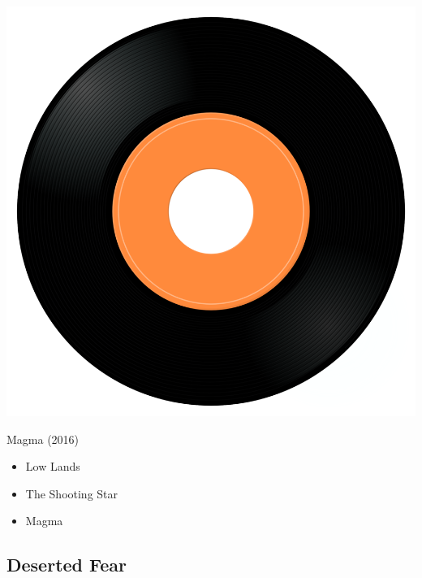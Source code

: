 \begin{minipage}[t]{0.25\textwidth}\vspace{0pt}
\captionsetup{type=figure}
\includegraphics[width=\textwidth]{Images/cover.png}
\caption*{Magma (2016)}
\end{minipage}
\begin{minipage}[t]{0.25\textwidth}\vspace{0pt}
\begin{itemize}[nosep,leftmargin=1em,labelwidth=*,align=left]
	\setlength{\itemsep}{0pt}
	\item Low Lands
	\item The Shooting Star
	\item Magma
\end{itemize}
\end{minipage}


\subsection{Deserted Fear}

